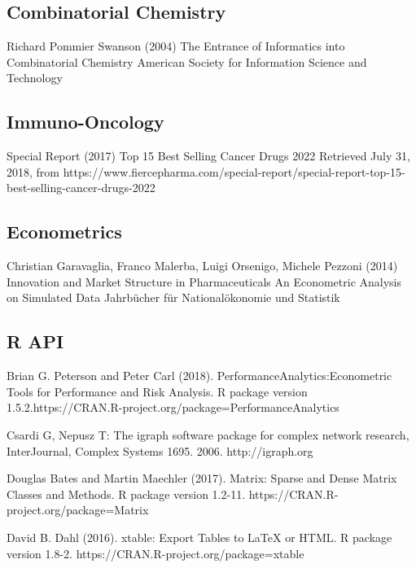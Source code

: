 \subsection{Combinatorial Chemistry}

Richard Pommier Swanson (2004)
\newblock The Entrance of Informatics into Combinatorial Chemistry
\newblock American Society for Information Science and Technology


\subsection{Immuno-Oncology}

Special Report (2017)
\newblock Top 15 Best Selling Cancer Drugs 2022
\newblock Retrieved July 31, 2018, from https://www.fiercepharma.com/special-report/special-report-top-15-best-selling-cancer-drugs-2022

\subsection{Econometrics}

 Christian Garavaglia, Franco Malerba, Luigi Orsenigo, Michele Pezzoni (2014)
\newblock Innovation and Market Structure in Pharmaceuticals An Econometric Analysis on Simulated Data
\newblock Jahrbücher für Nationalökonomie und Statistik 

\subsection{R API}

 Brian G. Peterson and Peter Carl (2018). 
\newblock PerformanceAnalytics:Econometric Tools for Performance and Risk Analysis. 
\newblock R package version 1.5.2.https://CRAN.R-project.org/package=PerformanceAnalytics

Csardi G, Nepusz T: 
\newblock The igraph software package for complex network research,
\newblock InterJournal, Complex Systems 1695. 2006. http://igraph.org

Douglas Bates and Martin Maechler (2017). 
\newblock Matrix: Sparse and Dense Matrix Classes and Methods. 
\newblock R package version 1.2-11. https://CRAN.R-project.org/package=Matrix

David B. Dahl (2016). 
\newblock xtable: Export Tables to LaTeX or HTML. 
\newblock R package version 1.8-2. https://CRAN.R-project.org/package=xtable

